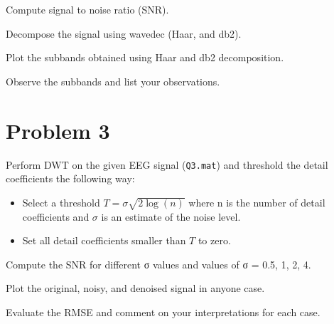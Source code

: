 \vspace{0.5cm}

\begin{tcolorbox}[colback=green!5!white,colframe=green!75!black,title=Problem 2.a]
    Compute signal to noise ratio (SNR).
\end{tcolorbox}

\begin{tcolorbox}[colback=green!5!white,colframe=green!75!black,title=Problem 2.b]
    Decompose the signal using wavedec (Haar, and db2).
\end{tcolorbox}

\begin{tcolorbox}[colback=green!5!white,colframe=green!75!black,title=Problem 2.c]
    Plot the subbands obtained using Haar and db2 decomposition.
\end{tcolorbox}

\begin{tcolorbox}[colback=green!5!white,colframe=green!75!black,title=Problem 2.d]
    Observe the subbands and list your observations.
\end{tcolorbox}




\section*{Problem 3} \label{sec:problem3}

\begin{tcolorbox}[colback=blue!5!white,boxrule=0pt,frame empty]
    Perform DWT on the given EEG signal (\verb|Q3.mat|) and threshold the detail coefficients
    the following way:
    \vspace{0.5em}
    \begin{itemize}
        \item Select a threshold $T = \sigma \sqrt{2 \log(n)}$ where n is the number of detail coefficients 
        and $\sigma$ is an estimate of the noise level.
        \item Set all detail coefficients smaller than $T$ to zero.
    \end{itemize}
\end{tcolorbox}


\vspace{0.5cm}

\begin{tcolorbox}[colback=blue!5!white,colframe=blue!75!black,title=Problem 3.a]
    Compute the SNR for different σ values and values of σ = {0.5, 1, 2, 4}.
\end{tcolorbox}

\begin{tcolorbox}[colback=blue!5!white,colframe=blue!75!black,title=Problem 3.b]
    Plot the original, noisy, and denoised signal in anyone case.
\end{tcolorbox}


\begin{tcolorbox}[colback=blue!5!white,colframe=blue!75!black,title=Problem 3.c]
    Evaluate the RMSE and comment on your interpretations for each case.

\end{tcolorbox}
